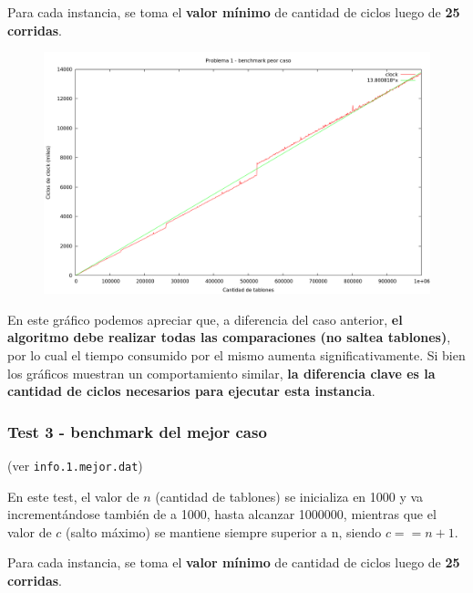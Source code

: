 Para cada instancia, se toma el \textbf{valor mínimo} de cantidad de ciclos luego de \textbf{25 corridas}.

\vspace*{0.5cm}

\begin{figure}[h]
  \begin{center}
    \includegraphics[scale=0.35]{imagenes/grafico-1-peor.png}
  \end{center}
\end{figure}

\vspace*{0.5cm}

En este gráfico podemos apreciar que, a diferencia del caso anterior, \textbf{el algoritmo debe realizar todas
las comparaciones (no saltea tablones)}, por lo cual el tiempo consumido por el mismo aumenta significativamente.
Si bien los gráficos muestran un comportamiento similar, \textbf{la diferencia clave es la cantidad de ciclos
necesarios para ejecutar esta instancia}.


\newpage


\subsubsection{Test 3 - benchmark del mejor caso}

(ver \verb|info.1.mejor.dat|) \medskip

En este test, el valor de $n$ (cantidad de tablones) se inicializa en 1000 y va incrementándose también de 
a 1000, hasta alcanzar 1000000, mientras que el valor de $c$ (salto máximo) se mantiene siempre superior a n, 
siendo $c == n+1$.

Para cada instancia, se toma el \textbf{valor mínimo} de cantidad de ciclos luego de \textbf{25 corridas}.



